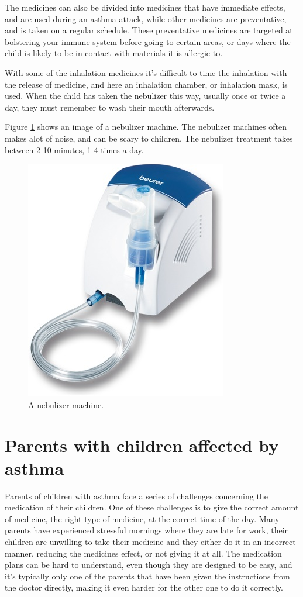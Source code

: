 The medicines can also be divided into medicines that have immediate effects, and are used during an asthma attack, while other medicines are preventative, 
and is taken on a regular schedule. These preventative medicines are targeted at bolstering your immune system before going to certain areas, or days
where the child is likely to be in contact with materials it is allergic to.	

With some of the inhalation medicines it's difficult to time the inhalation with the release of medicine, and here an inhalation chamber, or inhalation 
mask, is used. When the child has taken the nebulizer this way, usually once or twice a day, they must remember to wash their mouth afterwards.

Figure \ref{fig:paperprototype} shows an image of a nebulizer machine. The nebulizer machines often makes alot of noise, and can 
be scary to children. The nebulizer treatment takes between 2-10 minutes, 1-4 times a day.

\begin{figure}[t]
	\center
		\includegraphics[width=0.4\linewidth]{Pictures/nebulizer}
	\caption[A Nebulizer machine]{A nebulizer machine.\cite{nebulizer}}
	\label{fig:paperprototype}
\end{figure}

 

\section{Parents with children affected by asthma}

Parents of children with asthma face a series of challenges concerning the medication of their children. 
One of these challenges is to give the correct amount of medicine, the right type of medicine, at the 
correct time of the day. Many parents have experienced stressful mornings where they are late for work, 
their children are unwilling to take their medicine and they either do it in an incorrect manner, reducing the 
medicines effect, or not giving it at all. The medication plans can be hard to understand, even though they are 
designed to be easy, and it's typically only one of the parents that have been given the instructions from 
the doctor directly, making it even harder for the other one to do it correctly.


